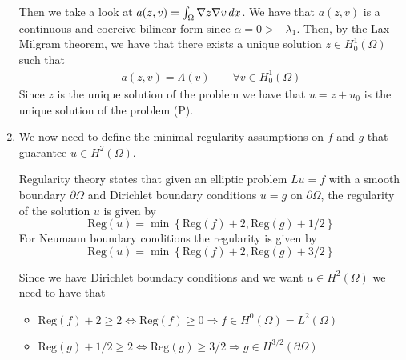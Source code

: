 \begin{enumerate}
    Then we take a look at \(a(z, v) = \int_\Omega \nabla z \nabla v \, dx\). We have that \(a(z, v)\) is a continuous and coercive bilinear form since \(\alpha = 0 > -\lambda_1\). Then, by the Lax-Milgram theorem, we have that there exists a unique solution \(z \in H^1_0(\Omega)\) such that
    \[
        \begin{split}
            a(z, v) = \Lambda(v) \qquad \forall v \in H^1_0(\Omega)
        \end{split}
    \]
    Since \(z\) is the unique solution of the problem we have that \(u = z + u_0\) is the unique solution of the problem (P).
    \item We now need to define the minimal regularity assumptions on \(f\) and \(g\) that guarantee \(u \in H^2(\Omega)\). 
    \begin{remark}
        Regularity theory states that given an elliptic problem \(Lu = f\) with a smooth boundary \(\partial\Omega\) and Dirichlet boundary conditions \(u = g\) on \(\partial\Omega\), the regularity of the solution \(u\) is given by
        \[
            \text{Reg}(u) = \min\left\{\text{Reg}(f) + 2, \text{Reg}(g) + 1/2\right\}
        \]
        For Neumann boundary conditions the regularity is given by
        \[
            \text{Reg}(u) = \min\left\{\text{Reg}(f) + 2, \text{Reg}(g) + 3/2\right\}
        \]
    \end{remark}
    Since we have Dirichlet boundary conditions and we want \(u \in H^2(\Omega)\) we need to have that
    \begin{itemize}
        \item \(\text{Reg}(f) + 2 \geq 2 \iff \text{Reg}(f) \geq 0 \Rightarrow f \in H^0(\Omega) = L^2(\Omega)\)
        \item \(\text{Reg}(g) + 1/2 \geq 2 \iff \text{Reg}(g) \geq 3/2 \Rightarrow g \in H^{3/2}(\partial\Omega)\)
    \end{itemize}
\end{enumerate}

